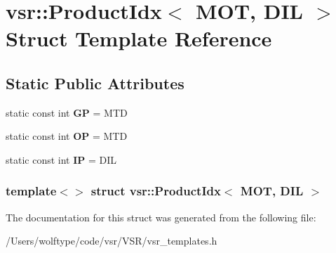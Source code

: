 \hypertarget{structvsr_1_1_product_idx_3_01_m_o_t_00_01_d_i_l_01_4}{\section{vsr\-:\-:Product\-Idx$<$ M\-O\-T, D\-I\-L $>$ Struct Template Reference}
\label{structvsr_1_1_product_idx_3_01_m_o_t_00_01_d_i_l_01_4}
}
\subsection*{Static Public Attributes}
\begin{DoxyCompactItemize}
\item 
\hypertarget{structvsr_1_1_product_idx_3_01_m_o_t_00_01_d_i_l_01_4_a126a4df0a5d9ba0bc4803fc8122ed4c6}{static const int {\bfseries G\-P} = M\-T\-D}\label{structvsr_1_1_product_idx_3_01_m_o_t_00_01_d_i_l_01_4_a126a4df0a5d9ba0bc4803fc8122ed4c6}

\item 
\hypertarget{structvsr_1_1_product_idx_3_01_m_o_t_00_01_d_i_l_01_4_a16a1f5ac3d6a54584890494707bfeeab}{static const int {\bfseries O\-P} = M\-T\-D}\label{structvsr_1_1_product_idx_3_01_m_o_t_00_01_d_i_l_01_4_a16a1f5ac3d6a54584890494707bfeeab}

\item 
\hypertarget{structvsr_1_1_product_idx_3_01_m_o_t_00_01_d_i_l_01_4_ae6a1573fc5aeb59d470cb52ef6e21fa5}{static const int {\bfseries I\-P} = D\-I\-L}\label{structvsr_1_1_product_idx_3_01_m_o_t_00_01_d_i_l_01_4_ae6a1573fc5aeb59d470cb52ef6e21fa5}

\end{DoxyCompactItemize}
\subsubsection*{template$<$$>$ struct vsr\-::\-Product\-Idx$<$ M\-O\-T, D\-I\-L $>$}



The documentation for this struct was generated from the following file\-:\begin{DoxyCompactItemize}
\item 
/\-Users/wolftype/code/vsr/\-V\-S\-R/vsr\-\_\-templates.\-h\end{DoxyCompactItemize}
